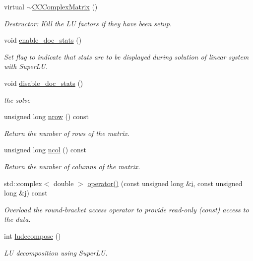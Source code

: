 \begin{DoxyCompactItemize}
virtual \hyperlink{classoomph_1_1CCComplexMatrix_a061e34b3b777e15df53071c25a8bb895}{$\sim$\+C\+C\+Complex\+Matrix} ()
\begin{DoxyCompactList}\small\item\em Destructor\+: Kill the LU factors if they have been setup. \end{DoxyCompactList}\item 
void \hyperlink{classoomph_1_1CCComplexMatrix_afccd0ba0992ac02b062d8051bcd0d34e}{enable\+\_\+doc\+\_\+stats} ()
\begin{DoxyCompactList}\small\item\em Set flag to indicate that stats are to be displayed during solution of linear system with Super\+LU. \end{DoxyCompactList}\item 
void \hyperlink{classoomph_1_1CCComplexMatrix_ad5b2b64350d3335d136a8e96ffca267f}{disable\+\_\+doc\+\_\+stats} ()
\begin{DoxyCompactList}\small\item\em the solve \end{DoxyCompactList}\item 
unsigned long \hyperlink{classoomph_1_1CCComplexMatrix_a52c78210ebe95b72ead8d938f5c7a9bb}{nrow} () const
\begin{DoxyCompactList}\small\item\em Return the number of rows of the matrix. \end{DoxyCompactList}\item 
unsigned long \hyperlink{classoomph_1_1CCComplexMatrix_a62540288d116687aa4bd201787845b4d}{ncol} () const
\begin{DoxyCompactList}\small\item\em Return the number of columns of the matrix. \end{DoxyCompactList}\item 
std\+::complex$<$ double $>$ \hyperlink{classoomph_1_1CCComplexMatrix_a09035e7b3fc0346ed91f4ddff4bebc13}{operator()} (const unsigned long \&\hyperlink{cfortran_8h_adb50e893b86b3e55e751a42eab3cba82}{i}, const unsigned long \&j) const
\begin{DoxyCompactList}\small\item\em Overload the round-\/bracket access operator to provide read-\/only (const) access to the data. \end{DoxyCompactList}\item 
int \hyperlink{classoomph_1_1CCComplexMatrix_a7076d4dc153b80fe4adbedbfb916b395}{ludecompose} ()
\begin{DoxyCompactList}\small\item\em LU decomposition using Super\+LU. \end{DoxyCompactList}\item 

\end{DoxyCompactItemize}
